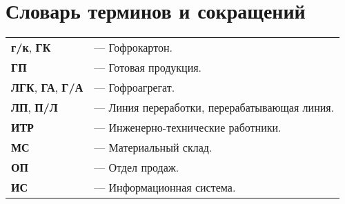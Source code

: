 \section*{Словарь терминов и сокращений}
\noindent

\begin{tabular}{l l}
{\bf г/к}, {\bf ГК}  & --- Гофрокартон.\\
{\bf ГП}  & --- Готовая продукция.\\
{\bf ЛГК}, {\bf ГА}, {\bf Г/А}  & --- Гофроагрегат.\\
{\bf ЛП}, {\bf П/Л}  & --- Линия переработки, перерабатывающая линия.\\

{\bf ИТР}  & --- Инженерно-технические работники.\\

{\bf МС}  & --- Материальный склад.\\
{\bf ОП}  & --- Отдел продаж.\\
{\bf ИС}  & --- Информационная система.\\


\end{tabular}
